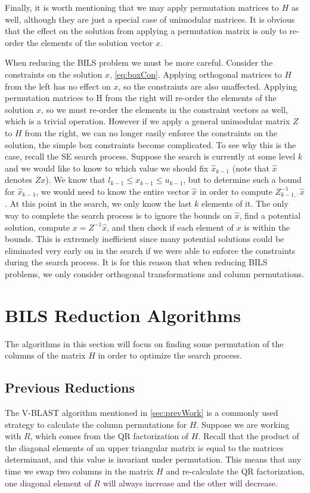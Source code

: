 \documentclass[12pt,Bold,letterpaper]{mcgilletdclass}
\begin{document}
Finally, it is worth mentioning that we may apply permutation matrices to $H$ as well, although they are just a special case of unimodular matrices. It is obvious that the effect on the solution from applying a permutation matrix is only to re-order the elements of the solution vector $x$.

When reducing the BILS problem we must be more careful. Consider the constraints on the solution $x$, \eqref{eq:boxCon}. Applying orthogonal matrices to $H$ from the left has no effect on $x$, so the constraints are also unaffected. Applying permutation matrices to H from the right will re-order the elements of the solution $x$, so we must re-order the elements in the constraint vectors as well, which is a trivial operation. However if we apply a general unimodular matrix $Z$ to $H$ from the right, we can no longer easily enforce the constraints on the solution, the simple box constraints become complicated. To see why this is the case, recall the SE search process. Suppose the search is currently at some level $k$ and we would like to know to which value we should fix $\hat{x}_{k-1}$ (note that $\hat{x}$ denotes $Zx$). We know that $l_{k-1} \le x_{k-1} \le u_{k-1}$, but to determine such a bound for $\hat{x}_{k-1}$, we would need to know the entire vector $\hat{x}$ in order to compute $Z^{-1}_{k-1,:}\hat{x}$. At this point in the search, we only know the last $k$ elements of it. The only way to complete the search process is to ignore the bounds on $\hat{x}$, find a potential solution, compute $x = Z^{-1}\hat{x}$, and then check if each element of $x$ is within the bounds. This is extremely inefficient since many potential solutions could be eliminated very early on in the search if we were able to enforce the constraints during the search process. It is for this reason that when reducing BILS problems, we only consider orthogonal transformations and column permutations.

\section{BILS Reduction Algorithms}

The algorithms in this section will focus on finding some permutation of the columns of the matrix $H$ in order to optimize the search process.

\subsection{Previous Reductions}
The V-BLAST algorithm \cite{FosGVW99} mentioned in \ref{sec:prevWork} is a commonly used strategy to calculate the column permutations for $H$. Suppose we are working with $R$, which comes from the QR factorization of $H$. Recall that the product of the diagonal elements of an upper triangular matrix is equal to the matrices determinant, and this value is invariant under permutation. This means that any time we swap two columns in the matrix $H$ and re-calculate the QR factorization, one diagonal element of $R$ will always increase and the other will decrease.
\end{document}
